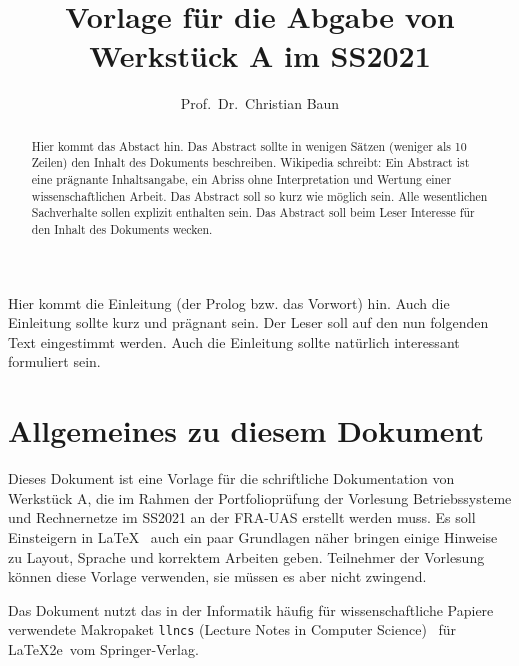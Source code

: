 \documentclass{llncs}
\begin{document}
%
%
%
\mainmatter              %
%
\title{Vorlage für die Abgabe von Werkstück A im SS2021}
%
\author{Prof.~Dr.~Christian Baun}
%

\maketitle              %

\begin{abstract}
Hier kommt das Abstact hin. Das Abstract sollte in wenigen Sätzen (weniger als 10 Zeilen) den Inhalt des Dokuments beschreiben. Wikipedia schreibt: Ein Abstract ist eine prägnante Inhaltsangabe, ein Abriss ohne Interpretation und Wertung einer wissenschaftlichen Arbeit. Das Abstract soll so kurz wie möglich sein. Alle wesentlichen Sachverhalte sollen explizit enthalten sein. Das Abstract soll beim Leser Interesse für den Inhalt des Dokuments wecken.
\end{abstract}

Hier kommt die Einleitung (der Prolog bzw. das Vorwort) hin. Auch die Einleitung sollte kurz und prägnant sein. Der Leser soll auf den nun folgenden Text eingestimmt werden. Auch die Einleitung sollte natürlich interessant formuliert sein.

\section{Allgemeines zu diesem Dokument}

Dieses Dokument ist eine Vorlage für die schriftliche Dokumentation von Werkstück A, die im Rahmen der Portfolioprüfung der  Vorlesung Betriebssysteme und Rechnernetze im SS2021 an der FRA-UAS erstellt werden muss. Es soll Einsteigern in \LaTeX~\cite{LaTeXWeb} auch ein paar Grundlagen näher bringen einige Hinweise zu Layout, Sprache und korrektem Arbeiten geben. Teilnehmer der Vorlesung können diese Vorlage verwenden, sie müssen es aber nicht zwingend. 

Das Dokument nutzt das in der Informatik häufig für wissenschaftliche Papiere verwendete Makropaket \texttt{llncs} (Lecture Notes in Computer Science)~\cite{SpringerWeb} für \LaTeX2e\ vom Springer-Verlag.
\end{document}
